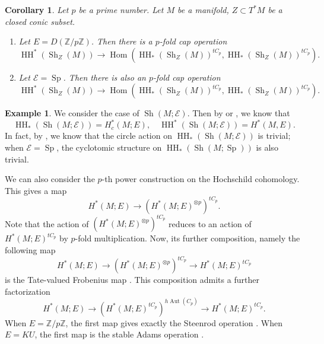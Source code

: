 \documentclass[11pt]{amsart}
\numberwithin{equation}{section}
\theoremstyle{plain}
\newtheorem{Coro}[coro]{Corollary}
\theoremstyle{definition}
\newtheorem{eg}[Eg]{Example}
\theoremstyle{remark}
\newcommand{\bZ} { {\mathbb{Z}}}
\newcommand{\cE} { {\mathcal{E}}}
\newcommand{\Sh} { {\operatorname{Sh}}}
\newcommand\HH{\operatorname{HH}}
\newcommand\Hom{\operatorname{Hom}}
\newcommand\Sp{ {\operatorname{Sp} } }
\begin{document}
\begin{Coro}Let $p$ be a prime number. Let $M$ be a manifold, $Z \subset T^*M$ be a closed conic subset. 
\begin{enumerate}
    \item[(1)] Let $E = D(\bZ/p\bZ)$. Then there is a $p$-fold cap operation
    \[\HH^*(\Sh_Z(M)) \to \Hom(\HH_*(\Sh_Z(M))^{tC_p}, \HH_*(\Sh_Z(M))^{tC_p}).\]
    \item[(2)] Let $\cE = \Sp$. Then there is also an $p$-fold cap operation
    \[\HH^*(\Sh_Z(M)) \to \Hom(\HH_*(\Sh_Z(M))^{tC_p}, \HH_*(\Sh_Z(M))^{tC_p}).\]
\end{enumerate}
\end{Coro}

\begin{eg}
We consider the case of $\Sh(M; \cE)$. Then by \cite[Proposition 3.2 \& Corollary 3.3]{Hochschild-Kuo-Shende-Zhang} or \cite[Theorem 0.2]{Efimov-K-theory}, we know that
\[\HH_*(\Sh(M; \cE)) = H_c^*(M; E), \quad \HH^*(\Sh(M; \cE)) = H^*(M, E).\]
In fact, by \cite[Theorem 0.2]{Efimov-K-theory}, we know that the circle action on $\HH_*(\Sh(M; \cE))$ is trivial; when $\cE = \Sp$, the cyclotomic structure on $\HH_*(\Sh(M; \Sp))$ is also trivial.

We can also consider the $p$-th power construction on the Hochschild cohomology. This gives a map
\[H^*(M; E) \to (H^*(M; E)^{\otimes p})^{tC_p}.\]
Note that the action of $(H^*(M; E)^{\otimes p})^{tC_p}$ reduces to an action of $H^*(M; E)^{tC_p}$ by $p$-fold multiplication. Now, its further composition, namely the following map
\[H^*(M; E) \to (H^*(M; E)^{\otimes p})^{tC_p} \to H^*(M; E)^{tC_p}\]
is the Tate-valued Frobenius map \cite[Definition IV.1.1]{Nikolaus-Scholze-Ontopologicalcyclichomology}. This composition admits a further factorization \cite[Corollary IV.1.4]{Nikolaus-Scholze-Ontopologicalcyclichomology}
\[H^*(M; E) \to (H^*(M; E)^{tC_p})^{h\operatorname{Aut}(C_p)} \to H^*(M; E)^{tC_p}.\]
When  $E = \bZ/p\bZ$, the first map gives exactly the Steenrod operation \cite[Theorem IV.1.15]{Nikolaus-Scholze-Ontopologicalcyclichomology}. When $E = KU$, the first map is the stable Adams operation \cite[Proposition IV.1.12]{Nikolaus-Scholze-Ontopologicalcyclichomology}.
\end{eg}
\end{document}
